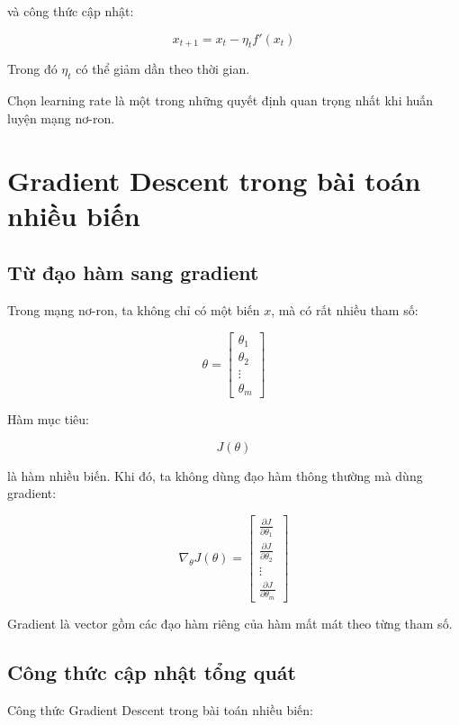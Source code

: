 và công thức cập nhật:

\[
    x_{t+1}=x_t-\eta_t f'(x_t)
\]

Trong đó $\eta_t$ có thể giảm dần theo thời gian.

\begin{ghinho}
Chọn learning rate là một trong những quyết định quan trọng nhất khi huấn luyện mạng nơ-ron.
\end{ghinho}

\section{Gradient Descent trong bài toán nhiều biến}

\subsection{Từ đạo hàm sang gradient}

Trong mạng nơ-ron, ta không chỉ có một biến $x$, mà có rất nhiều tham số:

\[
    \theta =
    \begin{bmatrix}
    \theta_1\\
    \theta_2\\
    \vdots\\
    \theta_m
    \end{bmatrix}
\]

Hàm mục tiêu:

\[
    J(\theta)
\]

là hàm nhiều biến. Khi đó, ta không dùng đạo hàm thông thường mà dùng gradient:

\[
    \nabla_{\theta}J(\theta)
    =
    \begin{bmatrix}
    \frac{\partial J}{\partial \theta_1}\\
    \frac{\partial J}{\partial \theta_2}\\
    \vdots\\
    \frac{\partial J}{\partial \theta_m}
    \end{bmatrix}
\]

Gradient là vector gồm các đạo hàm riêng của hàm mất mát theo từng tham số.

\subsection{Công thức cập nhật tổng quát}

Công thức Gradient Descent trong bài toán nhiều biến:

